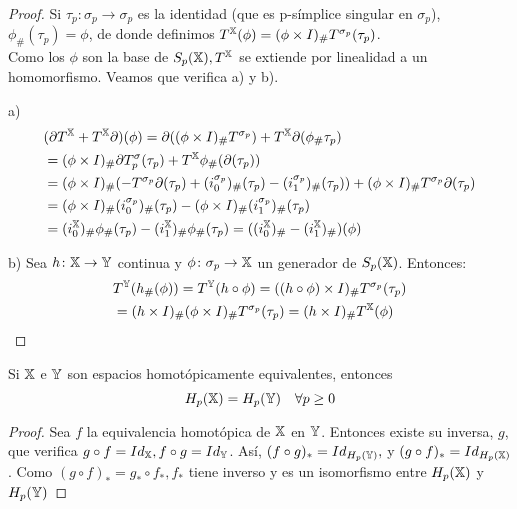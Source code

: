 \begin{proof}
  Si $\tau_p \colon \sigma_p \to \sigma_p$ es la identidad (que es p-símplice singular en $\sigma_p$), $\phi_\#(\tau_p) = \phi$,
  de donde definimos $T^{\mathbb X}(\phi) = (\phi \times I)_\# T^{\sigma_p}(\tau_p)$. \\
  Como los $\phi$ son la base de $S_{p}({\mathbb X}), T^{\mathbb X}$ se extiende por linealidad a un homomorfismo. Veamos que verifica a) y b).

  a)
  \begin{align*}
    &(\partial T^{\mathbb X} + T^{\mathbb X} \partial)(\phi) = \partial((\phi \times I)_\# T^{\sigma_p}) + T^{\mathbb X} \partial(\phi_\# \tau_p) \\
    &= (\phi \times I)_\# \partial T^\sigma_p(\tau_p) + T^{\mathbb X} \phi_\#(\partial(\tau_p)) \\
    &= (\phi \times I)_\# (- T^{\sigma_p} \partial(\tau_p) + (i_0^{\sigma_p})_\# (\tau_p) - (i_1^{\sigma_p})_\# (\tau_p)) + (\phi \times I)_\# T^{\sigma_p}\partial(\tau_p) \\
    &= (\phi \times I)_\# (i_0^{\sigma_p})_\#(\tau_p) - (\phi \times I)_\# (i_1^{\sigma_p})_\#(\tau_p) \\
    &= (i_0^{\mathbb X})_\# \phi_\#(\tau_p) - (i_1^{\mathbb X})_\# \phi_\#(\tau_p) = ((i_0^{\mathbb X})_\# - (i_1^{\mathbb X})_\#) (\phi)
  \end{align*}

  b) Sea $h\colon {\mathbb X} \to {\mathbb Y}$ continua y $\phi \colon \sigma_p \to {\mathbb X}$ un generador de $S_{p}({\mathbb X})$. Entonces:
  \begin{align*}
    &T^{\mathbb Y}(h_\#(\phi)) = T^{\mathbb Y}(h \circ \phi) = ((h \circ \phi) \times I)_\# T^{\sigma_p}(\tau_p) \\
    &= (h \times I)_\# (\phi \times I)_\# T^{\sigma_p} (\tau_p) = (h \times I)_\# T^{\mathbb X}(\phi)
  \end{align*}
\end{proof}

\begin{corollary}
  Si ${\mathbb X}$ e ${\mathbb Y}$ son espacios homotópicamente equivalentes, entonces \[H_p({\mathbb X}) = H_p({\mathbb Y}) \quad \forall p \geq 0\]
\end{corollary}

\begin{proof}
  Sea $f$ la equivalencia homotópica de ${\mathbb X}$ en ${\mathbb Y}$. Entonces existe su inversa, $g$, que verifica $g \circ f = Id_{\mathbb X}, f \circ g = Id_{\mathbb Y}$.
  Así, $(f \circ g)_* = Id_{H_p({\mathbb Y})},$ y $(g \circ f)_* = Id_{H_p({\mathbb X})}$. Como $(g \circ f)_* = g_* \circ f_*, f_*$ tiene inverso y es un isomorfismo
  entre $H_p({\mathbb X})$ y $H_p({\mathbb Y})$
\end{proof}

